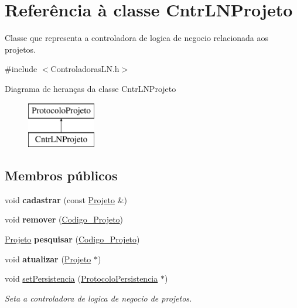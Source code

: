 \hypertarget{class_cntr_l_n_projeto}{
\section{\-Referência à classe \-Cntr\-L\-N\-Projeto}
\label{class_cntr_l_n_projeto}
}


\-Classe que representa a controladora de logica de negocio relacionada aos projetos.  




{\ttfamily \#include $<$\-Controladoras\-L\-N.\-h$>$}

\-Diagrama de heranças da classe \-Cntr\-L\-N\-Projeto\begin{figure}[H]
\begin{center}
\leavevmode
\includegraphics[height=2.000000cm]{class_cntr_l_n_projeto}
\end{center}
\end{figure}
\subsection*{\-Membros públicos}
\begin{DoxyCompactItemize}
\item 
\hypertarget{class_cntr_l_n_projeto_a04e97cbe898505b8be41361c5aa25863}{
void {\bfseries cadastrar} (const \hyperlink{class_projeto}{\-Projeto} \&)}
\label{class_cntr_l_n_projeto_a04e97cbe898505b8be41361c5aa25863}

\item 
\hypertarget{class_cntr_l_n_projeto_a9c6b515a33c830bb01ce4662fabb220e}{
void {\bfseries remover} (\hyperlink{class_codigo___projeto}{\-Codigo\-\_\-\-Projeto})}
\label{class_cntr_l_n_projeto_a9c6b515a33c830bb01ce4662fabb220e}

\item 
\hypertarget{class_cntr_l_n_projeto_a0cc5e822020c2bf6cf1b81dcb29d1076}{
\hyperlink{class_projeto}{\-Projeto} {\bfseries pesquisar} (\hyperlink{class_codigo___projeto}{\-Codigo\-\_\-\-Projeto})}
\label{class_cntr_l_n_projeto_a0cc5e822020c2bf6cf1b81dcb29d1076}

\item 
\hypertarget{class_cntr_l_n_projeto_a4fb8dfd83c8c91d96dffb6f6e5f20e36}{
void {\bfseries atualizar} (\hyperlink{class_projeto}{\-Projeto} $\ast$)}
\label{class_cntr_l_n_projeto_a4fb8dfd83c8c91d96dffb6f6e5f20e36}

\item 
void \hyperlink{class_cntr_l_n_projeto_a615a8c182106c8b312970d52fa0f4e5a}{set\-Persistencia} (\hyperlink{class_protocolo_persistencia}{\-Protocolo\-Persistencia} $\ast$)
\begin{DoxyCompactList}\small\item\em \-Seta a controladora de logica de negocio de projetos. \end{DoxyCompactList}\end{DoxyCompactItemize}

